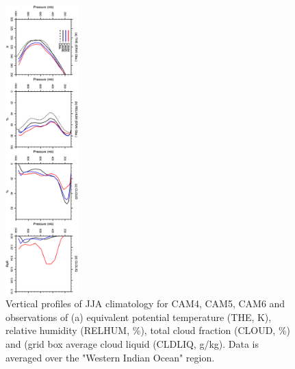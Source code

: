\clearpage
\begin{figure}[t]
  \begin{center}
    \includegraphics[width=0.25\textwidth,angle=90.]{./figs/f_vprof_wio_JJA.pdf}
  \end{center}
  \caption{Vertical profiles of JJA climatology for CAM4, CAM5, CAM6 and observations of (a) equivalent potential temperature (THE, K), relative humidity (RELHUM, \%), total cloud fraction (CLOUD, \%) and (grid box average cloud liquid (CLDLIQ, g/kg). Data is averaged over the "Western Indian Ocean" region.} 
\label{f_vprof_wio_JJA}
\end{figure} 

